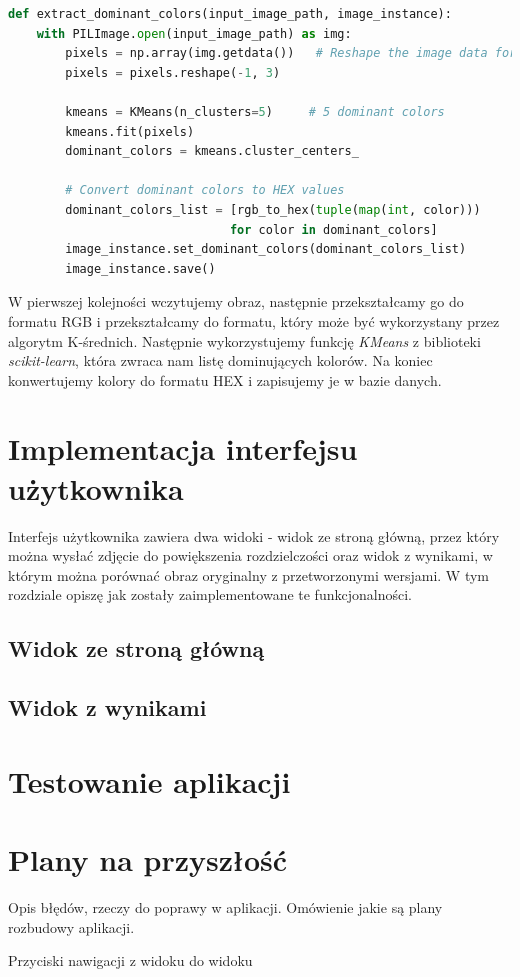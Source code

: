 \begin{lstlisting}[language=Python, caption=Implementacja algorytmu K-średnich., label={lst:kmeans}]
def extract_dominant_colors(input_image_path, image_instance):
    with PILImage.open(input_image_path) as img:
        pixels = np.array(img.getdata())   # Reshape the image data for k-means
        pixels = pixels.reshape(-1, 3)

        kmeans = KMeans(n_clusters=5)     # 5 dominant colors
        kmeans.fit(pixels)
        dominant_colors = kmeans.cluster_centers_

        # Convert dominant colors to HEX values
        dominant_colors_list = [rgb_to_hex(tuple(map(int, color))) 
                               for color in dominant_colors]
        image_instance.set_dominant_colors(dominant_colors_list)
        image_instance.save()
\end{lstlisting}

W pierwszej kolejności wczytujemy obraz, następnie przekształcamy go do formatu RGB i przekształcamy do formatu, który może być wykorzystany przez algorytm K-średnich. Następnie wykorzystujemy funkcję \textit{KMeans} z biblioteki \textit{scikit-learn}, która zwraca nam listę dominujących kolorów. Na koniec konwertujemy kolory do formatu HEX i zapisujemy je w bazie danych.

\section{Implementacja interfejsu użytkownika}

Interfejs użytkownika zawiera dwa widoki - widok ze stroną główną, przez który można wysłać zdjęcie do powiększenia rozdzielczości oraz widok z wynikami, w którym można porównać obraz oryginalny z przetworzonymi wersjami. W tym rozdziale opiszę jak zostały zaimplementowane te funkcjonalności.




\subsection*{Widok ze stroną główną}






\subsection*{Widok z wynikami}





\section{Testowanie aplikacji}


\section{Plany na przyszłość} \label{sec:plans}

Opis błędów, rzeczy do poprawy w aplikacji. Omówienie jakie są plany rozbudowy aplikacji.

Przyciski nawigacji z widoku do widoku